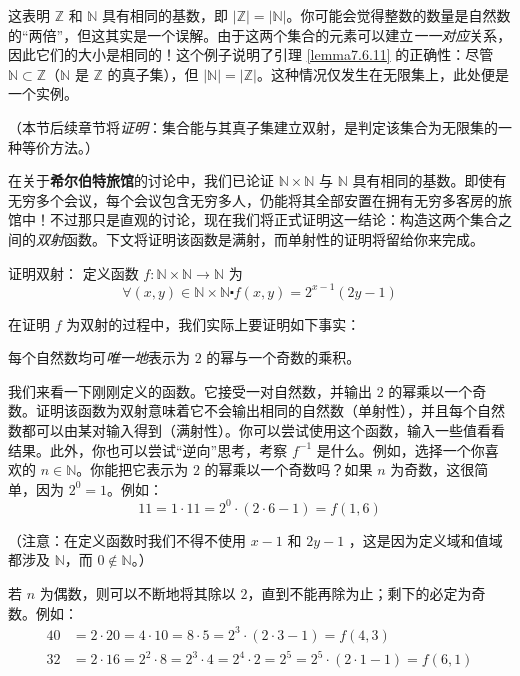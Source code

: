 这表明 $\mathbb{Z}$ 和 $\mathbb{N}$ 具有相同的基数，即 $|\mathbb{Z}| = |\mathbb{N}|$。你可能会觉得整数的数量是自然数的``两倍''，但这其实是一个误解。由于这两个集合的元素可以建立\emph{一一对应}关系，因此它们的大小是相同的！这个例子说明了引理 \ref{lemma7.6.11} 的正确性：尽管 $\mathbb{N} \subset \mathbb{Z}$（$\mathbb{N}$ 是 $\mathbb{Z}$ 的真子集），但 $|\mathbb{N}| = |\mathbb{Z}|$。这种情况仅发生在无限集上，此处便是一个实例。

（本节后续章节将\emph{证明}：集合能与其真子集建立双射，是判定该集合为无限集的一种等价方法。）\\

\begin{example}\label{ex:example7.6.13}

    在关于\textbf{希尔伯特旅馆}的讨论中，我们已论证 $\mathbb{N} \times \mathbb{N}$ 与 $\mathbb{N}$ 具有相同的基数。即使有无穷多个会议，每个会议包含无穷多人，仍能将其全部安置在拥有无穷多客房的旅馆中！不过那只是直观的讨论，现在我们将正式证明这一结论：构造这两个集合之间的\emph{双射}函数。下文将证明该函数是满射，而单射性的证明将留给你来完成。

    \begin{proofs}{证明双射：}
        定义函数 $f : \mathbb{N} \times \mathbb{N} \to \mathbb{N}$ 为
        \[\forall (x, y) \in \mathbb{N} \times \mathbb{N} \centerdot f(x, y) = 2^{x-1}(2y - 1)\]

        在证明 $f$ 为双射的过程中，我们实际上要证明如下事实：
        \begin{center}
            每个自然数均可\emph{唯一地}表示为 $2$ 的幂与一个奇数的乘积。
        \end{center}

        我们来看一下刚刚定义的函数。它接受一对自然数，并输出 $2$ 的幂乘以一个奇数。证明该函数为双射意味着它不会输出相同的自然数（单射性），并且每个自然数都可以由某对输入得到（满射性）。你可以尝试使用这个函数，输入一些值看看结果。此外，你也可以尝试``逆向''思考，考察 $f^{-1}$ 是什么。例如，选择一个你喜欢的 $n \in \mathbb{N}$。你能把它表示为 $2$ 的幂乘以一个奇数吗？如果 $n$ 为奇数，这很简单，因为 $2^0 = 1$。例如：
        \[11 = 1 \cdot 11 = 2^0 \cdot (2 \cdot 6 - 1) = f(1, 6)\]

        （注意：在定义函数时我们不得不使用 $x - 1$ 和 $2y - 1$ ，这是因为定义域和值域都涉及 $\mathbb{N}$，而 $0 \notin \mathbb{N}$。）

        若 $n$ 为偶数，则可以不断地将其除以 $2$，直到不能再除为止；剩下的必定为奇数。例如：
        \begin{align*}
            40 & = 2 \cdot 20 = 4 \cdot 10 = 8 \cdot 5 = 2^3 \cdot (2 \cdot 3 - 1) = f(4, 3)                        \\
            32 & = 2 \cdot 16 = 2^2 \cdot 8 = 2^3 \cdot 4 = 2^4 \cdot 2 = 2^5 = 2^5 \cdot (2 \cdot 1 - 1) = f(6, 1)
        \end{align*}


\end{proofs}
\end{example}
